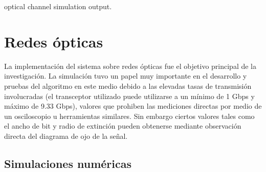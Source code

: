 optical channel simulation output. 


\section{Redes ópticas}
La implementación del sistema sobre redes ópticas fue el objetivo principal de la investigación.
La simulación tuvo un papel muy importante en el desarrollo y pruebas del algoritmo en este medio debido a las elevadas tasas de transmisión involucradas (el transceptor utilizado puede utilizarse a un mínimo de 1 Gbps y máximo de 9.33 Gbps), valores que prohiben las mediciones directas por medio de un osciloscopio u herramientas similares. Sin embargo ciertos valores tales como el ancho de bit y radio de extinción pueden obtenerse mediante observación directa del diagrama de ojo de la señal.

\subsection{Simulaciones numéricas}


